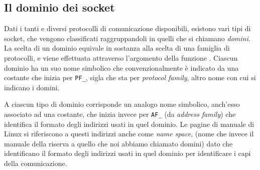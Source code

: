 \subsection{Il dominio dei socket}
\label{sec:sock_domain}

Dati i tanti e diversi protocolli di comunicazione disponibili, esistono vari
tipi di socket, che vengono classificati raggruppandoli in quelli che si
chiamano \textsl{domini}.  La scelta di un dominio equivale in sostanza alla
scelta di una famiglia di protocolli, e viene effettuata attraverso
l'argomento  della funzione . Ciascun dominio ha un
suo nome simbolico che convenzionalmente è indicato da una costante che inizia
per \texttt{PF\_}, sigla che sta per \textit{protocol family}, altro nome con
cui si indicano i domini.

A ciascun tipo di dominio corrisponde un analogo nome simbolico, anch'esso
associato ad una costante, che inizia invece per \texttt{AF\_} (da
\textit{address family}) che identifica il formato degli indirizzi usati in
quel dominio. Le pagine di manuale di Linux si riferiscono a questi indirizzi
anche come \textit{name space}, (nome che invece il manuale della 
riserva a quello che noi abbiamo chiamato domini) dato che identificano il
formato degli indirizzi usati in quel dominio per identificare i capi della
comunicazione.

